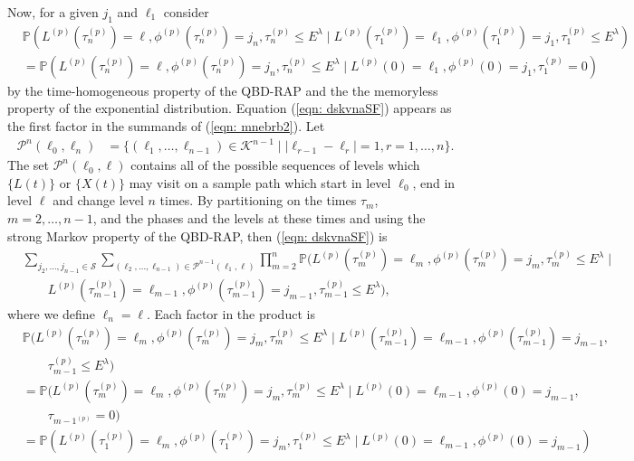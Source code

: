 Now, for a given \(j_1\) and \(\ell_1\) consider 
\begin{align}
	&\mathbb P(L^{(p)}(\tau_n^{(p)}) = \ell, \phi^{(p)}(\tau_n^{(p)}) = j_n, \tau_{n}^{(p)}\leq E^\lambda 
	 \mid L^{(p)}(\tau_1^{(p)})=\ell_1, 
	 \phi^{(p)}(\tau_1^{(p)})=j_1, \tau_1^{(p)}\leq E^\lambda) \nonumber 
	\\&=\mathbb P(L^{(p)}(\tau_n^{(p)}) = \ell, \phi^{(p)}(\tau_n^{(p)}) = j_n, \tau_{n}^{(p)}\leq E^\lambda 
	 \mid L^{(p)}(0)=\ell_1, 
	 \phi^{(p)}(0)=j_1, \tau_1^{(p)}=0)\label{eqn: dskvnaSF}
\end{align}
by the time-homogeneous property of the QBD-RAP and the the memoryless property of the exponential distribution.
Equation (\ref{eqn: dskvnaSF}) appears as the first factor in the summands of (\ref{eqn: mnebrb2}). Let 
\begin{align}\label{eqn: paths set1}
	\mathcal P^n(\ell_0,\ell_n)&=\{(\ell_1,\dots,\ell_{n-1}) \in \mathcal K^{n-1}\mid |\ell_{r-1}-\ell_r|=1,r = 1,\dots,n\}.
\end{align}
The set \(\mathcal P^n(\ell_0,\ell)\) contains all of the possible sequences of levels which \(\{L(t)\}\) or \(\{X(t)\}\) may visit on a sample path which start in level \(\ell_0\), end in level \(\ell\) and change level \(n\) times. By partitioning on the times \(\tau_m\), \(m=2,\dots,n-1\), and the phases and the levels at these times and using the strong Markov property of the QBD-RAP, then (\ref{eqn: dskvnaSF}) is  
	\begin{align}
	 &\sum_{j_2,\dots,j_{n-1}\in\mathcal S}\sum_{(\ell_2,\dots,\ell_{n-1}) \in\mathcal P^{n-1}(\ell_1,\ell)}\prod_{m=2}^{n}\mathbb P(L^{(p)}(\tau_m^{(p)}) = \ell_m, \phi^{(p)}(\tau_m^{(p)}) = j_m, \tau_{m}^{(p)}\leq E^\lambda 
            	 \mid \nonumber
	 	 \\&\qquad L^{(p)}(\tau_{m-1}^{(p)}) = \ell_{m-1}, \phi^{(p)}(\tau_{m-1}^{(p)}) = j_{m-1}, \tau_{m-1}^{(p)}\leq E^\lambda),  \label{eqn: 161222}
\end{align}
where we define \(\ell_n=\ell\). Each factor in the product is 
\begin{align}
	&\mathbb P(L^{(p)}(\tau_m^{(p)}) = \ell_m, \phi^{(p)}(\tau_m^{(p)}) = j_m, \tau_{m}^{(p)}\leq E^\lambda 
            	 \mid L^{(p)}(\tau_{m-1}^{(p)}) = \ell_{m-1}, \nonumber
	 	 \phi^{(p)}(\tau_{m-1}^{(p)}) = j_{m-1}, \\&\qquad{}\tau_{m-1}^{(p)}\leq E^\lambda) \nonumber 
	\\&=\mathbb P(L^{(p)}(\tau_m^{(p)}) = \ell_m, \phi^{(p)}(\tau_m^{(p)}) = j_m, \tau_{m}^{(p)}\leq E^\lambda 
            	 \mid L^{(p)}(0) = \ell_{m-1}, \nonumber 
	 	 \phi^{(p)}(0) = j_{m-1}, \\&\qquad{}\tau_{m-1^{(p)}}=0)\nonumber
	\\&=\mathbb P(L^{(p)}(\tau_1^{(p)}) = \ell_m, \phi^{(p)}(\tau_1^{(p)}) = j_m, \tau_{1}^{(p)}\leq E^\lambda 
            	 \mid L^{(p)}(0) = \ell_{m-1}, 
	 	 \phi^{(p)}(0) = j_{m-1})\label{eqn: kk}
\end{align}
